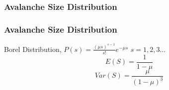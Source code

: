 \documentclass[mathserif]{beamer}
\begin{document}
\begin{frame}
\begin{center}


\end{center}

\end{frame}


\begin{frame}
\frametitle{Avalanche Size Distribution}

\end{frame}

\begin{frame}
\frametitle{Avalanche Size Distribution}
Borel Distribution, $P(s) = \frac{(\mu s)^{s-1}}{s!} e^{-\mu s}$ $s=1, 2, 3...$
$$E(S) = \frac{1}{1-\mu}$$
$$Var(S)=\frac{\mu}{(1-\mu)^3}$$

\end{frame}
\end{document}

